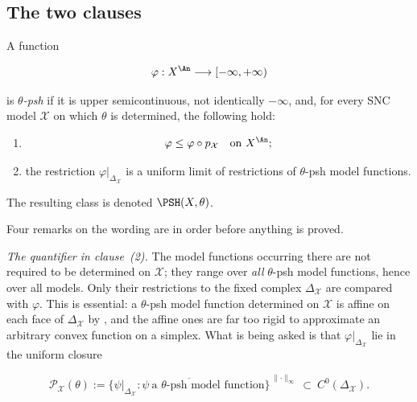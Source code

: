 \subsection{The two clauses}
\label{sec:ch21-two-clauses}

\begin{definition}\label{def:ch21-bfj-psh}
A function

\[
             \varphi:X^{\An}\longrightarrow[-\infty,+\infty)
\]

is \emph{$\theta$-psh} if it is upper semicontinuous, not identically
$-\infty$, and, for every SNC model $\mathcal X$ on which $\theta$ is
determined, the following hold:

\begin{enumerate}
\item
\begin{equation}
\label{eq:ch21-retraction-inequality}
                    \varphi\leq\varphi\circ p_{\mathcal X}
                    \quad\text{on }X^{\An};
\end{equation}

\item the restriction $\varphi|_{\Delta_{\mathcal X}}$ is a uniform limit
of restrictions of $\theta$-psh model functions.
\end{enumerate}

The resulting class is denoted $\PSH(X,\theta)$.
\end{definition}

Four remarks on the wording are in order before anything is proved.

\emph{The quantifier in clause~(2).}  The model functions occurring there
are not required to be determined on $\mathcal X$; they range over
\emph{all} $\theta$-psh model functions, hence over all models.  Only
their restrictions to the fixed complex $\Delta_{\mathcal X}$ are compared
with $\varphi$.  This is essential: a $\theta$-psh model function
determined on $\mathcal X$ is affine on each face of
$\Delta_{\mathcal X}$ by , and the affine
ones are far too rigid to approximate an arbitrary convex function on a
simplex.  What is being asked is that
$\varphi|_{\Delta_{\mathcal X}}$ lie in the uniform closure

\begin{equation}
\label{eq:ch21-skeletal-closure}
 \mathcal P_{\mathcal X}(\theta)
 :=\overline{
   \bigl\{\psi|_{\Delta_{\mathcal X}}:
   \psi\ \text{a $\theta$-psh model function}\bigr\}
   }^{\,\lVert\cdot\rVert_\infty}
   \ \subset\ C^0(\Delta_{\mathcal X}).
\end{equation}

